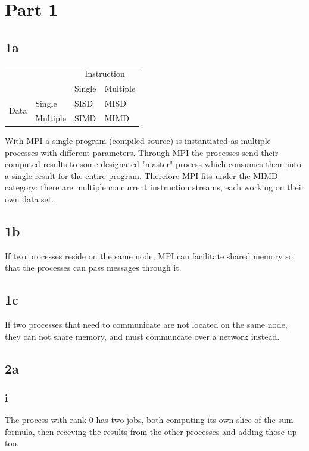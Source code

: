 \section*{Part 1}
\subsection*{1a}
\begin{table}[h]
    \begin{tabular}{ll|ll}
        ~    & ~        & \multicolumn{2}{c}{Instruction} \\
        ~    & ~        & Single      & Multiple \\\hline
        \multirow{2}{*}{Data}         & Single   & SISD        & MISD     \\
        ~    & Multiple & SIMD        & MIMD     \\
    \end{tabular}
\end{table}

With MPI a single program (compiled source) is instantiated as multiple processes with different parameters.
Through MPI the processes send their computed results to some designated "master" process which consumes them into a single result for the entire program.
Therefore MPI fits under the MIMD category: there are multiple concurrent instruction streams, each working on their own data set.

\subsection*{1b}
If two processes reside on the same node, MPI can facilitate shared memory so that the processes can pass messages through it.

\subsection*{1c}
If two processes that need to communicate are not located on the same node,
they can not share memory, and must communcate over a network instead.

\subsection*{2a}
\subsubsection*{i}
The process with rank 0 has two jobs,
both computing its own slice of the sum formula,
then receving the results from the other processes and adding those up too.

